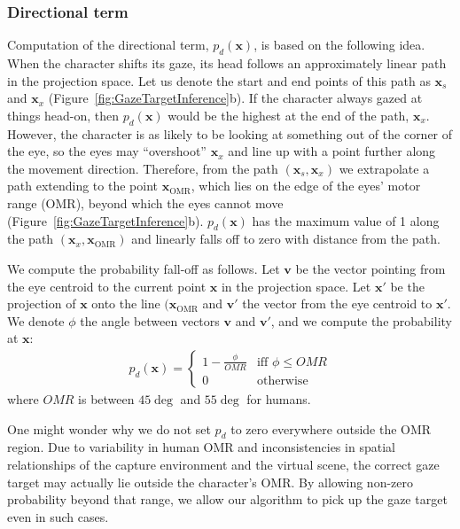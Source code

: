 \subsubsection{Directional term}

Computation of the directional term, $p_d(\mathbf{x})$, is based on the following idea. When the character shifts its gaze, its head follows an approximately linear path in the projection space. Let us denote the start and end points of this path as $\mathbf{x}_s$ and $\mathbf{x}_x$ (Figure~\ref{fig:GazeTargetInference}b). If the character always gazed at things head-on, then $p_d(\mathbf{x})$ would be the highest at the end of the path, $\mathbf{x}_x$. However, the character is as likely to be looking at something out of the corner of the eye, so the eyes may ``overshoot'' $\mathbf{x}_x$ and line up with a point further along the movement direction. Therefore, from the path $(\mathbf{x}_s, \mathbf{x}_x)$ we extrapolate a path extending to the point $\mathbf{x}_{\mathrm{OMR}}$, which lies on the edge of the eyes' motor range (OMR), beyond which the eyes cannot move (Figure~\ref{fig:GazeTargetInference}b). $p_d(\mathbf{x})$ has the maximum value of 1 along the path $(\mathbf{x}_x, \mathbf{x}_{\mathrm{OMR}})$ and linearly falls off to zero with distance from the path.

We compute the probability fall-off as follows. Let $\mathbf{v}$ be the vector pointing from the eye centroid to the current point $\mathbf{x}$ in the projection space. Let $\mathbf{x}'$ be the projection of $\mathbf{x}$ onto the line $(\mathbf{x}_{\mathrm{OMR}}$ and $\mathbf{v}'$ the vector from the eye centroid to $\mathbf{x}'$. We denote $\phi$ the angle between vectors $\mathbf{v}$ and $\mathbf{v}'$, and we compute the probability at $\mathbf{x}$:
%
\begin{align} \label{eq:GazeDirectionProbability}
p_d(\mathbf{x}) =
\begin{cases}
1 - \frac{\phi}{OMR} & \text{iff } \phi \leq OMR \\
0 & \text{otherwise}
\end{cases}
\end{align}
%
where $OMR$ is between $45\deg$ and $55\deg$ for humans.

One might wonder why we do not set $p_d$ to zero everywhere outside the OMR region. Due to variability in human OMR and inconsistencies in spatial relationships of the capture environment and the virtual scene, the correct gaze target may actually lie outside the character's OMR. By allowing non-zero probability beyond that range, we allow our algorithm to pick up the gaze target even in such cases.

